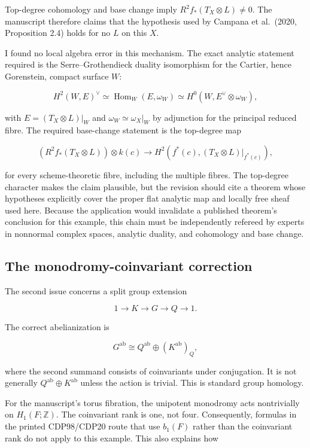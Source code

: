 \documentclass[
  10pt,
  letterpaper,
]{article}
\newcommand{\Z}{\mathbb Z}
\begin{document}
Top-degree cohomology and base change imply
\(R^2f_*(T_X\otimes L)\ne0\). The manuscript therefore claims that the
hypothesis used by Campana et al.~(2020, Proposition 2.4) holds for no
\(L\) on this \(X\).

I found no local algebra error in this mechanism. The exact analytic
statement required is the Serre--Grothendieck duality isomorphism for
the Cartier, hence Gorenstein, compact surface \(W\):

\[
H^2(W,E)^\vee\simeq\operatorname{Hom}_W(E,\omega_W)
\simeq H^0(W,E^\vee\otimes\omega_W),
\]

with \(E=(T_X\otimes L)|_W\) and \(\omega_W\simeq\omega_X|_W\) by
adjunction for the principal reduced fibre. The required base-change
statement is the top-degree map

\[
(R^2f_*(T_X\otimes L))\otimes k(c)
\longrightarrow H^2(f^*(c),(T_X\otimes L)|_{f^*(c)}),
\]

for every scheme-theoretic fibre, including the multiple fibres. The
top-degree character makes the claim plausible, but the revision should
cite a theorem whose hypotheses explicitly cover the proper flat
analytic map and locally free sheaf used here. Because the application
would invalidate a published theorem's conclusion for this example, this
chain must be independently refereed by experts in nonnormal complex
spaces, analytic duality, and cohomology and base change.

\subsection{The monodromy-coinvariant
correction}\label{the-monodromy-coinvariant-correction}

The second issue concerns a split group extension

\[
1\to K\to G\to Q\to1.
\]

The correct abelianization is

\[
G^{\mathrm{ab}}\cong Q^{\mathrm{ab}}\oplus(K^{\mathrm{ab}})_Q,
\]

where the second summand consists of coinvariants under conjugation. It
is not generally \(Q^{\mathrm{ab}}\oplus K^{\mathrm{ab}}\) unless the
action is trivial. This is standard group homology.

For the manuscript's torus fibration, the unipotent monodromy acts
nontrivially on \(H_1(F;\Z)\). The coinvariant rank is one, not four.
Consequently, formulas in the printed CDP98/CDP20 route that use
\(b_1(F)\) rather than the coinvariant rank do not apply to this
example. This also explains how
\end{document}
